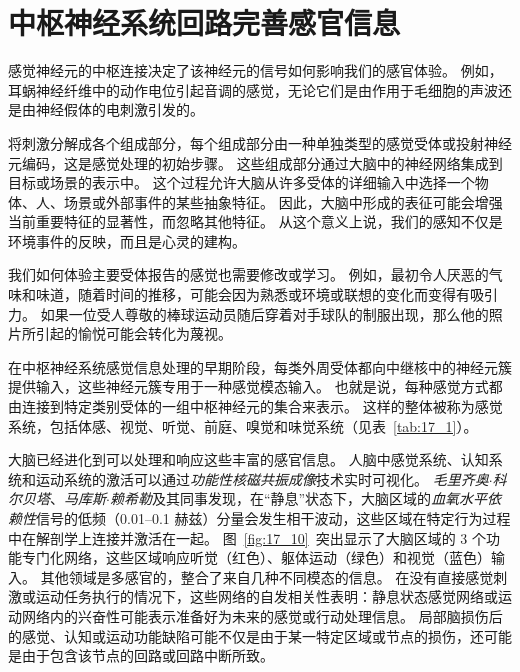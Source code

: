 \section{中枢神经系统回路完善感官信息}

感觉神经元的中枢连接决定了该神经元的信号如何影响我们的感官体验。 
例如，耳蜗神经纤维中的动作电位引起音调的感觉，无论它们是由作用于毛细胞的声波还是由神经假体的电刺激引发的。


将刺激分解成各个组成部分，每个组成部分由一种单独类型的感觉受体或投射神经元编码，这是感觉处理的初始步骤。
这些组成部分通过大脑中的神经网络集成到目标或场景的表示中。
这个过程允许大脑从许多受体的详细输入中选择一个物体、人、场景或外部事件的某些抽象特征。
因此，大脑中形成的表征可能会增强当前重要特征的显著性，而忽略其他特征。
从这个意义上说，我们的感知不仅是环境事件的反映，而且是心灵的建构。


我们如何体验主要受体报告的感觉也需要修改或学习。 
例如，最初令人厌恶的气味和味道，随着时间的推移，可能会因为熟悉或环境或联想的变化而变得有吸引力。
如果一位受人尊敬的棒球运动员随后穿着对手球队的制服出现，那么他的照片所引起的愉悦可能会转化为蔑视。


在中枢神经系统感觉信息处理的早期阶段，每类外周受体都向中继核中的神经元簇提供输入，这些神经元簇专用于一种感觉模态输入。
也就是说，每种感觉方式都由连接到特定类别受体的一组中枢神经元的集合来表示。
这样的整体被称为感觉系统，包括体感、视觉、听觉、前庭、嗅觉和味觉系统（见表~\ref{tab:17_1}）。


大脑已经进化到可以处理和响应这些丰富的感官信息。 
人脑中感觉系统、认知系统和运动系统的激活可以通过\textit{功能性核磁共振成像}技术实时可视化。
\textit{毛里齐奥$\cdot$科尔贝塔}、\textit{马库斯$\cdot$赖希勒}及其同事发现，在“静息”状态下，大脑区域的\textit{血氧水平依赖性}信号的低频（0.01–0.1 赫兹）分量会发生相干波动，这些区域在特定行为过程中在解剖学上连接并激活在一起。
图~\ref{fig:17_10}~突出显示了大脑区域的 3 个功能专门化网络，这些区域响应听觉（红色）、躯体运动（绿色）和视觉（蓝色）输入。
其他领域是多感官的，整合了来自几种不同模态的信息。
在没有直接感觉刺激或运动任务执行的情况下，这些网络的自发相关性表明：静息状态感觉网络或运动网络内的兴奋性可能表示准备好为未来的感觉或行动处理信息。
局部脑损伤后的感觉、认知或运动功能缺陷可能不仅是由于某一特定区域或节点的损伤，还可能是由于包含该节点的回路或回路中断所致。


